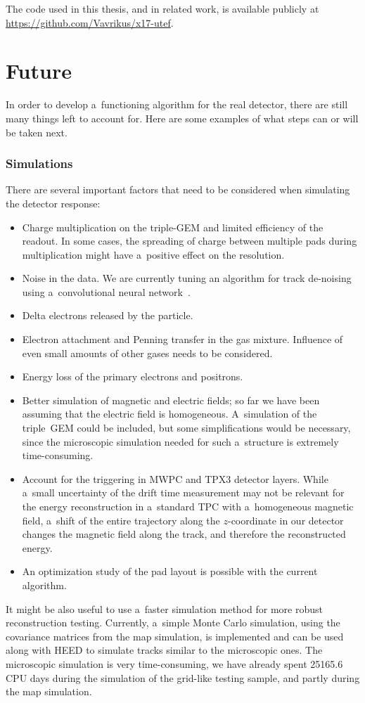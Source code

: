 		The code used in this thesis, and in related work, is available publicly at \url{https://github.com/Vavrikus/x17-utef}.
	\section*{Future}
		In order to develop a~functioning algorithm for the real detector, there are still many things left to account for. Here are some examples of what steps can or will be taken next.
		
	\subsubsection*{Simulations}
		There are several important factors that need to be considered when simulating the detector response:
		\begin{itemize}
			\item Charge multiplication on the triple-\ac{GEM} and limited efficiency of the readout. In some cases, the spreading of charge between multiple pads during multiplication might have a~positive effect on the resolution.
			\item Noise in the data. We are currently tuning an algorithm for track de-noising using a~convolutional neural network~\cite{Gajdoš_2025}.
			\item Delta electrons released by the particle.
			\item Electron attachment and Penning transfer in the gas mixture. Influence of even small amounts of other gases needs to be considered.
			\item Energy loss of the primary electrons and positrons.
			\item Better simulation of magnetic and electric fields; so far we have been assuming that the electric field is homogeneous. A~simulation of the triple~\ac{GEM} could be included, but some simplifications would be necessary, since the microscopic simulation needed for such a~structure is extremely time-consuming.
			\item Account for the triggering in \ac{MWPC} and \acf{TPX3} detector layers. While a~small uncertainty of the drift time measurement may not be relevant for the energy reconstruction in a~standard \ac{TPC} with a~homogeneous magnetic field, a~shift of the entire trajectory along the $z$\nobreakdash-coordinate in our detector changes the magnetic field along the track, and therefore the reconstructed energy.
			\item An optimization study of the pad layout is possible with the current algorithm.
		\end{itemize}
		It might be also useful to use a~faster simulation method for more robust reconstruction testing. Currently, a~simple Monte Carlo simulation, using the covariance matrices from the map simulation, is implemented and can be used along with \ac{HEED} to simulate tracks similar to the microscopic ones. The microscopic simulation is very time-consuming, we have already spent \num{25165.6} CPU days during the simulation of the grid-like testing sample, and partly during the map simulation.
		
